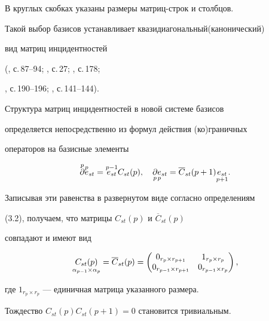 В круглых скобках указаны размеры матриц-строк и столбцов. 


 


Такой выбор базисов устанавливает квазидиагональный(канонический) 


вид матриц инцидентностей 


(\cite{Sei}, с.\,87--94; \cite{Dub}, с.\,27; \cite{Sti}, с.\,178; 


\cite{Lef}, с.\,190--196; \cite{Mas}, с.\,141--144). 


 


Структура матриц инцидентностей в новой системе базисов 


определяется непосредственно из формул действия (ко)граничных 


операторов на базисные элементы 


\begin{equation} 


\up{p}{\partial}\up{p}{e}_{st}=\up{p-1}{e_{st}}C_{st}(p),\quad 


\down{p}{\partial}\down{p}{e}_{st}= 


\overline C_{st}(p+1)\down{p+1}{e_{st}}. 


\end{equation} 


Записывая эти равенства в развернутом виде согласно определениям 


(3.2), получаем, что матрицы $C_{st}(p)$ и $\overline C_{st}(p)$ 


совпадают и имеют вид


\begin{equation} 


\down{\alpha_{p-1}\times\alpha_p}{C_{st}(p)}=\overline C_{st}(p)= 


\begin{pmatrix} 


0_{r_p\times r_{p+1}}& 1_{r_p\times r_p}\\ 


0_{r_{p-1}\times r_{p+1}}& 0_{r_{p-1}\times r_p} 


\end{pmatrix}, 


\end{equation} 


где $1_{r_p\times r_p}$ --- единичная матрица указанного размера. 


 


Тождество $C_{st}(p)C_{st}(p+1)=0$ становится тривиальным. 


